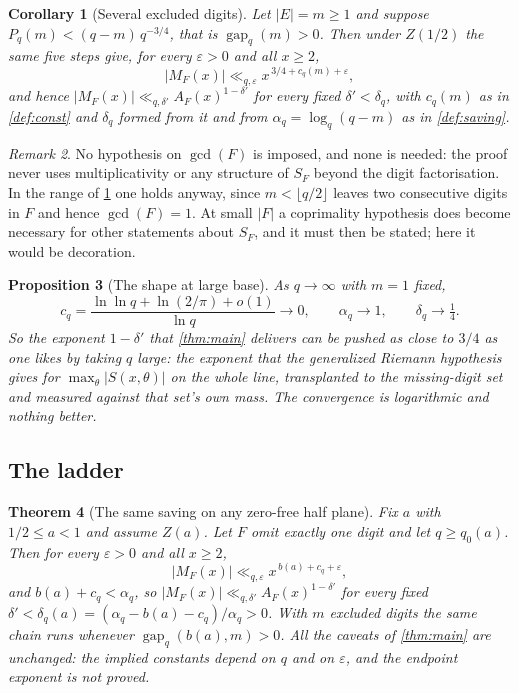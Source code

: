 \documentclass[11pt]{amsart}
\newtheorem{theorem}{Theorem}[section]
\newtheorem{proposition}[theorem]{Proposition}
\newtheorem{corollary}[theorem]{Corollary}
\theoremstyle{definition}
\theoremstyle{remark}
\newtheorem{remark}[theorem]{Remark}
\begin{document}
\begin{corollary}[Several excluded digits]
\label{cor:multi}
Let $|E| = m \ge 1$ and suppose $P_q(m) < (q-m)\,q^{-3/4}$, that is $\operatorname{gap}_q(m) > 0$. Then under $Z(1/2)$ the same five steps give, for every $\varepsilon > 0$ and all $x \ge 2$,
\[
  |M_F(x)| \ll_{q,\varepsilon} x^{\,3/4 + c_q(m) + \varepsilon},
\]
and hence $|M_F(x)| \ll_{q,\delta'} A_F(x)^{1-\delta'}$ for every fixed $\delta' < \delta_q$, with $c_q(m)$ as in \cref{def:const} and $\delta_q$ formed from it and from $\alpha_q = \log_q(q-m)$ as in \cref{def:saving}.
\end{corollary}

\begin{remark}
\label{rem:gcd}
No hypothesis on $\gcd(F)$ is imposed, and none is needed: the proof never uses multiplicativity or any structure of $S_F$ beyond the digit factorisation. In the range of \cref{cor:multi} one holds anyway, since $m < \lfloor q/2 \rfloor$ leaves two consecutive digits in $F$ and hence $\gcd(F) = 1$. At small $|F|$ a coprimality hypothesis does become necessary for other statements about $S_F$, and it must then be stated; here it would be decoration.
\end{remark}

\begin{proposition}[The shape at large base]
\label{prop:shape}
As $q \to \infty$ with $m = 1$ fixed,
\[
  c_q = \frac{\ln\ln q + \ln(2/\pi) + o(1)}{\ln q} \longrightarrow 0,
  \qquad \alpha_q \longrightarrow 1, \qquad \delta_q \longrightarrow \tfrac14 .
\]
So the exponent $1 - \delta'$ that \cref{thm:main} delivers can be pushed as close to $3/4$ as one likes by taking $q$ large: the exponent that the generalized Riemann hypothesis gives for $\max_\theta |S(x,\theta)|$ on the whole line, transplanted to the missing-digit set and measured against that set's own mass. The convergence is logarithmic and nothing better.
\end{proposition}

\subsection*{The ladder}

\begin{theorem}[The same saving on any zero-free half plane]
\label{thm:ladder}
Fix $a$ with $1/2 \le a < 1$ and assume $Z(a)$. Let $F$ omit exactly one digit and let $q \ge q_0(a)$. Then for every $\varepsilon > 0$ and all $x \ge 2$,
\[
  |M_F(x)| \ll_{q,\varepsilon} x^{\,b(a) + c_q + \varepsilon},
\]
and $b(a) + c_q < \alpha_q$, so $|M_F(x)| \ll_{q,\delta'} A_F(x)^{1-\delta'}$ for every fixed $\delta' < \delta_q(a) = (\alpha_q - b(a) - c_q)/\alpha_q > 0$. With $m$ excluded digits the same chain runs whenever $\operatorname{gap}_q(b(a), m) > 0$. All the caveats of \cref{thm:main} are unchanged: the implied constants depend on $q$ and on $\varepsilon$, and the endpoint exponent is not proved.
\end{theorem}
\end{document}
